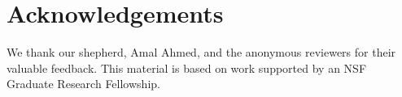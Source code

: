 \section*{Acknowledgements}

We thank our shepherd, Amal Ahmed, and the anonymous reviewers for their
valuable feedback. This material is based on work supported by an NSF Graduate
Research Fellowship.
